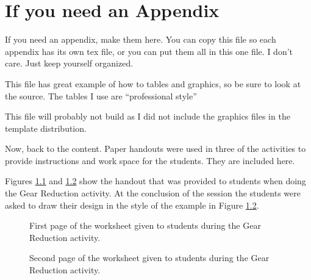 \chapter{If you need an Appendix}

If you need an appendix, make them here. You can copy this file so each appendix has its own tex file, or you can put them all in this one file. I don't care. Just keep yourself organized.

This file has great example of how to tables and graphics, so be sure to look at the source. The tables I use are ``professional style''

This file will probably not build as I did not include the graphics files in the template distribution.

Now, back to the content. Paper handouts were used in three of the activities to provide instructions and work space for the students. They are included here.


	\label{sec:gearshandout}

	Figures \ref{fig:gearshandout1} and \ref{fig:gearshandout2} show the handout that was provided to students when doing the Gear Reduction activity. At the conclusion of the session the students were asked to draw their design in the style of the example in Figure \ref{fig:gearshandout2}.


\setlength\fboxsep{0pt}
\setlength\fboxrule{0.5pt}

	\begin{figure}
	\centering
	\caption[Gear Reduction handout, page 1.]{First page of the worksheet given to students during the Gear Reduction activity.}
	\label{fig:gearshandout1}
	\end{figure}

	\begin{figure}
	\centering
	\caption[Gear Reduction handout, page 2.]{Second page of the worksheet given to students during the Gear Reduction activity.}
	\label{fig:gearshandout2}
	\end{figure}


